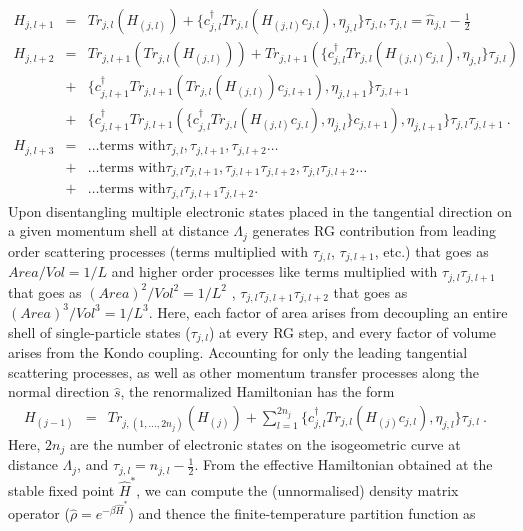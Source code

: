 \documentclass[aps,prb,preprint,groupedaddress]{revtex4-2}
\begin{document}
\begin{eqnarray}
	H_{j,l+1}&=&Tr_{j,l}(H_{(j,l)})+\lbrace c^{\dagger}_{j,l}Tr_{j,l}(H_{(j,l)}c_{j,l}),\eta_{j,l}\rbrace\tau_{j,l}, \tau_{j,l}=\hat{n}_{j,l}-\frac{1}{2}\nonumber\label{one}\\ 
H_{j,l+2}&=&Tr_{j,l+1}(Tr_{j,l}(H_{(j,l)}))+Tr_{j,l+1}(\lbrace c^{\dagger}_{j,l}Tr_{j,l}(H_{(j,l)}c_{j,l}),\eta_{j,l}\rbrace\tau_{j,l})\nonumber\\
&+&\lbrace c^{\dagger}_{j,l+1}Tr_{j,l+1}(Tr_{j,l}(H_{(j,l)})c_{j,l+1}),\eta_{j,l+1}\rbrace\tau_{j,l+1}\nonumber\\
&+&\lbrace c^{\dagger}_{j,l+1}Tr_{j,l+1}(\lbrace c^{\dagger}_{j,l}Tr_{j,l}(H_{(j,l)}c_{j,l}),\eta_{j,l}\rbrace c_{j,l+1}),\eta_{j,l+1}\rbrace\tau_{j,l}\tau_{j,l+1}~.\nonumber\\
H_{j,l+3}&=&\ldots\text{terms with} \tau_{j,l}, \tau_{j,l+1}, \tau_{j,l+2}\ldots\nonumber\\
 &+& \ldots\text{terms with} \tau_{j,l}\tau_{j,l+1}, \tau_{j,l+1}\tau_{j,l+2}, \tau_{j,l}\tau_{j,l+2}\ldots\nonumber\\
 &+&\ldots\text{terms with}\tau_{j,l}\tau_{j,l+1}\tau_{j,l+2}.
\label{2ndDisentanglement}
\end{eqnarray}
Upon disentangling multiple electronic states placed in the tangential direction on a given momentum shell at distance $\Lambda_{j}$ generates RG contribution from leading order scattering processes (terms multiplied with $\tau_{j,l}$, $\tau_{j,l+1}$, etc.) that goes as $Area/Vol=1/L$ and higher order processes like terms multiplied with $\tau_{j,l}\tau_{j,l+1}$ that goes as $(Area)^{2}/Vol^{2}=1/L^{2}$ , $\tau_{j,l}\tau_{j,l+1}\tau_{j,l+2}$ that goes as $(Area)^{3}/Vol^{3}=1/L^{3}$. Here, each factor of area arises from decoupling an entire shell of single-particle states ($\tau_{j,l}$) at every RG step, and every factor of volume arises from the Kondo coupling.
Accounting for only the leading tangential scattering processes, as well as other momentum transfer processes along the normal direction $\hat{s}$, the renormalized Hamiltonian has the form
\begin{eqnarray}
	H_{(j-1)}&=&Tr_{j,(1,\ldots,2n_{j})}(H_{(j)})+\sum_{l=1}^{2n_{j}}\lbrace c^{\dagger}_{j,l}Tr_{j,l}(H_{(j)}c_{j,l}),\eta_{j,l}\rbrace\tau_{j,l}~.~~~\label{HRG}
\end{eqnarray}
Here, $2n_{j}$ are the number of electronic states on the isogeometric curve at distance $\Lambda_{j}$, and $\tau_{j,l}= n_{j,l}-\frac{1}{2}$.
\pin
From the effective Hamiltonian obtained at the stable fixed point $\hat{H}^{*}$, we can compute the (unnormalised) density matrix operator ($\hat{\rho} = e^{-\beta \hat{H}^{*}}$) and thence the finite-temperature partition function as
\end{document}
